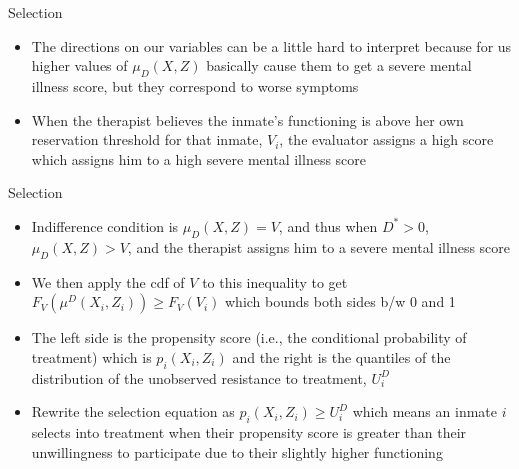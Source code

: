 \documentclass{beamer}
\begin{document}
\begin{frame}{Selection}

\begin{itemize}
\item The directions on our variables can be a little hard to interpret because for us higher values of $\mu_D(X,Z)$ basically cause them to get a severe mental illness score, but they correspond to worse symptoms
\item When the therapist believes the inmate's functioning is above her own reservation threshold for that inmate, $V_i$, the evaluator assigns a high score which assigns him to a high severe mental illness score
\end{itemize}

\end{frame}

\begin{frame}{Selection}

\begin{itemize}
\item Indifference condition is $\mu_D(X,Z)=V$, and thus when $D^*>0$, $\mu_D(X,Z)>V$, and the therapist assigns him to a severe mental illness score
\item We then apply the cdf of $V$ to this inequality to get $F_V(\mu^D(X_i,Z_i)) \geq F_V(V_i)$ which bounds both sides b/w 0 and 1
\item The left side is the propensity score (i.e., the conditional probability of treatment) which is $p_i(X_i,Z_i)$ and the right is the quantiles of the distribution of the unobserved resistance to treatment, $U_i^D$
\item Rewrite the selection equation  as $p_i(X_i,Z_i) \geq U_i^D$ which means an inmate $i$ selects into treatment when their propensity score is greater than their unwillingness to participate due to their slightly higher functioning
\end{itemize}

\end{frame}
\end{document}
